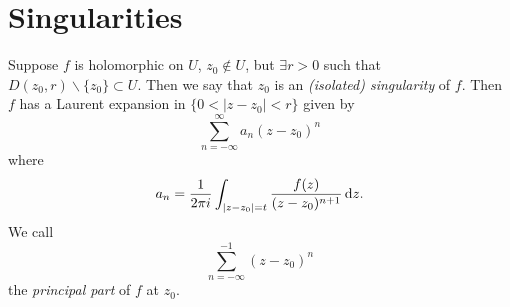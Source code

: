 \section{Singularities}
\begin{defn}
Suppose $f$ is holomorphic on $U$,
$z_0 \notin U$, but $\exists r > 0$ such that
$D(z_0, r) \backslash \{ z_0 \} \subset U$. Then
we say that $z_0$ is an \emph{(isolated) singularity} of $f$.
Then $f$ has a Laurent expansion in $\{ 0 < |z - z_0| < r\}$
given by
$$
\sum_{n=-\infty}^\infty a_n (z - z_0)^n
$$
where
$$
a_n = \frac{1}{2 \pi i}
      \int_{|z - z_0| = t}
        \frac{f(z)}{(z - z_0)^{n+1}}
        \mathop{}\!\mathrm{d} z.
$$
We call
$$
\sum_{n=-\infty}^{-1} (z - z_0)^n
$$
the \emph{principal part} of $f$ at $z_0$.
\end{defn}

